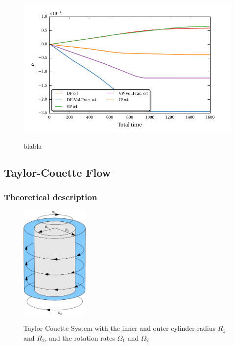 \newpage

\begin{figure}[!pb]
  \centering
  \includegraphics{gfx/immersed_boundary/hpflow/long/ts.pdf}\label{fig:hpflow_allgc_theo}
  \caption{blabla}
\end{figure}

\clearpage


\subsection{Taylor-Couette Flow}

\subsubsection{Theoretical description}
\begin{figure}[!b]
  \centering
  \includegraphics[width=0.3\textwidth]{gfx/immersed_boundary/tcflow/tcsystem.pdf}\label{fig:tcflow_system}
  \caption{Taylor Couette System with the inner and outer cylinder radius $R_1$ and $R_2$, and the rotation rates $\Omega_1$ and $\Omega_2$}
\end{figure}

